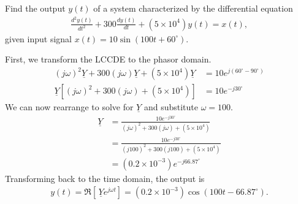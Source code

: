 \documentclass{report}
\begin{document}
\begin{example}
    Find the output $y(t)$ of a system characterized by the differential equation 
    \begin{align*}
        \frac{d^2y(t)}{dt^2} + 300\frac{dy(t)}{dt} + (5\times 10^4)y(t) = x(t),
    \end{align*}
    given input signal $x(t) = 10\sin(100t+60^{\circ})$.
\end{example}
\begin{solution}
    First, we transform the LCCDE to the phasor domain.
    \begin{align*}
        (j\omega)^2\underline{Y} + 300(j\omega)\underline{Y} + (5\times 10^4)\underline{Y} &= 10e^{j(60^{\circ}-90^{\circ})} \\ 
        \underline{Y} [(j\omega)^2 + 300(j\omega) + (5\times 10^4)] &= 10e^{-j30^{\circ}}
    \end{align*}
    We can now rearrange to solve for $\underline{Y}$ and substitute $\omega = 100$.
    \begin{align*}
        \underline{Y} &= \frac{10e^{-j30^{\circ}}}{(j\omega)^2 + 300(j\omega) + (5\times 10^4)} \\ 
        &= \frac{10e^{-j30^{\circ}}}{(j100)^2 + 300(j100) + (5\times 10^4)} \\
        &= (0.2\times 10^{-3})e^{-j66.87^{\circ}}
    \end{align*}
    Transforming back to the time domain, the output is 
    \begin{align*}
        y(t) = \Re[\,\underline{Y}e^{j\omega t}] = (0.2\times 10^{-3})\cos(100t - 66.87^{\circ}).
    \end{align*}
\end{solution}
\end{document}
